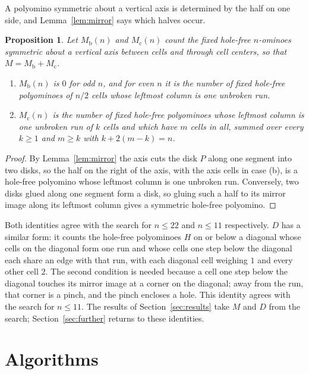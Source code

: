 \documentclass[11pt]{a000104}
\numberwithin{equation}{section}
\newtheorem{proposition}[lemma]{Proposition}
\begin{document}
A polyomino symmetric about a vertical axis is determined by the half on one side, and Lemma~\ref{lem:mirror} says which halves occur.

\begin{proposition}\label{prop:mirror}
Let $M_{\mathrm{b}}(n)$ and $M_{\mathrm{c}}(n)$ count the fixed hole-free $n$-ominoes symmetric about a vertical axis between cells and through cell centers, so that $M = M_{\mathrm{b}} + M_{\mathrm{c}}$.
\begin{enumerate}
  \item[(a)] $M_{\mathrm{b}}(n)$ is $0$ for odd $n$, and for even $n$ it is the number of fixed hole-free polyominoes of $n/2$ cells whose leftmost column is one unbroken run.
  \item[(b)] $M_{\mathrm{c}}(n)$ is the number of fixed hole-free polyominoes whose leftmost column is one unbroken run of $k$ cells and which have $m$ cells in all, summed over every $k \ge 1$ and $m \ge k$ with $k + 2(m - k) = n$.
\end{enumerate}
\end{proposition}

\begin{proof}
By Lemma~\ref{lem:mirror} the axis cuts the disk $P$ along one segment into two disks, so the half on the right of the axis, with the axis cells in case (b), is a hole-free polyomino whose leftmost column is one unbroken run.
Conversely, two disks glued along one segment form a disk, so gluing such a half to its mirror image along its leftmost column gives a symmetric hole-free polyomino.
\end{proof}

Both identities agree with the search for $n \le 22$ and $n \le 11$ respectively.
$D$ has a similar form: it counts the hole-free polyominoes $H$ on or below a diagonal whose cells on the diagonal form one run and whose cells one step below the diagonal each share an edge with that run, with each diagonal cell weighing $1$ and every other cell $2$.
The second condition is needed because a cell one step below the diagonal touches its mirror image at a corner on the diagonal; away from the run, that corner is a pinch, and the pinch encloses a hole.
This identity agrees with the search for $n \le 11$.
The results of Section~\ref{sec:results} take $M$ and $D$ from the search; Section~\ref{sec:further} returns to these identities.

\section{Algorithms}\label{sec:algorithms}
\end{document}
